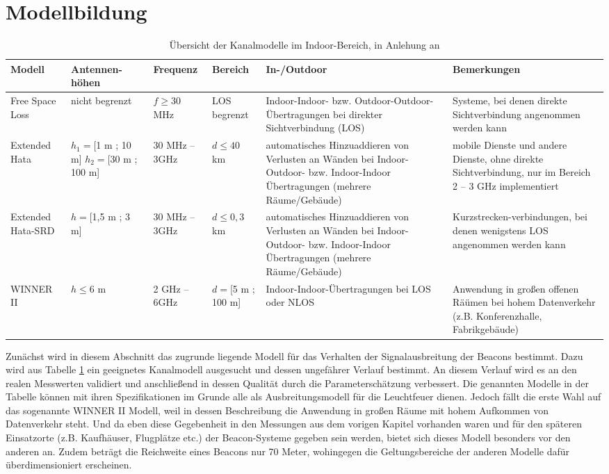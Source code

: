 \section{Modellbildung}
\begin{table}[b!]
\begin{tabular}{|m{1.6cm}|m{1.9cm}|m{1.7cm}|m{1.6cm}|m{3.1cm}|m{3.1cm}|}
\hline 
Modell & Antennen-höhen & Frequenz & Bereich & In-/Outdoor & Bemerkungen \\ \hline 
Free Space Loss & nicht begrenzt & $f\geq$30 MHz & LOS begrenzt & Indoor-Indoor- bzw. Outdoor-Outdoor-Übertragungen bei direkter Sichtverbindung (LOS) & Systeme, bei denen direkte Sichtverbindung angenommen werden kann \\ \hline 
Extended Hata & $h_1=$[1 m ; 10 m] $h_2=$[30 m ; 100 m] & 30 MHz -- 3GHz & $d\leq40$ km & automatisches Hinzuaddieren von Verlusten an Wänden bei Indoor-Outdoor- bzw. Indoor-Indoor Übertragungen (mehrere Räume/Gebäude) & mobile Dienste und andere Dienste, ohne direkte Sichtverbindung, nur im Bereich 2 -- 3 GHz implementiert \\ \hline 
Extended Hata-SRD & $h=$[1,5 m ; 3 m] & 30 MHz -- 3GHz & $d\leq0,3$ km & automatisches Hinzuaddieren von Verlusten an Wänden bei Indoor-Outdoor- bzw. Indoor-Indoor Übertragungen (mehrere Räume/Gebäude) & Kurzstrecken-verbindungen, bei denen wenigstens LOS angenommen werden kann \\ \hline 
WINNER II & $h\leq6$ m & 2 GHz -- 6GHz & $d=$[5 m ; 100 m] & Indoor-Indoor-Übertragungen bei LOS oder NLOS & Anwendung in großen offenen Räümen bei hohem Datenverkehr (z.B. Konferenzhalle, Fabrikgebäude) \\ \hline 
\end{tabular} 
\caption{Übersicht der Kanalmodelle im Indoor-Bereich, in Anlehung an \cite{Kanal}}
\label{tab:Uebersicht}
\end{table}
Zunächst wird in diesem Abschnitt das zugrunde liegende Modell für das Verhalten der Signalausbreitung der Beacons bestimmt. Dazu wird aus Tabelle \ref{tab:Uebersicht} ein geeignetes Kanalmodell ausgesucht und dessen ungefährer Verlauf bestimmt. An diesem Verlauf wird es an den realen Messwerten validiert und anschließend in dessen Qualität durch die Parameterschätzung verbessert. Die genannten Modelle in der Tabelle können mit ihren Spezifikationen im Grunde alle als Ausbreitungsmodell für die Leuchtfeuer dienen. Jedoch fällt die erste Wahl auf das sogenannte WINNER II Modell, weil in dessen Beschreibung die Anwendung in großen Räume mit hohem Aufkommen von Datenverkehr steht. Und da eben diese Gegebenheit in den Messungen aus dem vorigen Kapitel vorhanden waren und für den späteren Einsatzorte (z.B. Kaufhäuser, Flugplätze etc.) der Beacon-Systeme gegeben sein werden, bietet sich dieses Modell besonders vor den anderen an. Zudem beträgt die Reichweite eines Beacons nur 70 Meter, wohingegen die Geltungsbereiche der anderen Modelle dafür überdimensioniert erscheinen.

